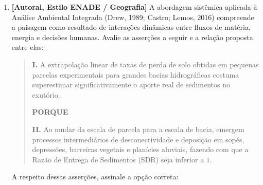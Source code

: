 \begin{enumerate}[leftmargin=1.8em, itemsep=5pt, resume]
  \item \textbf{[Autoral, Estilo ENADE / Geografia]} A abordagem sistêmica aplicada à Análise Ambiental Integrada (Drew, 1989; Castro; Lemos, 2016) compreende a paisagem como resultado de interações dinâmicas entre fluxos de matéria, energia e decisões humanas. Avalie as asserções a seguir e a relação proposta entre elas:
  \begin{quote}
    \textbf{I.} A extrapolação linear de taxas de perda de solo obtidas em pequenas parcelas experimentais para grandes bacias hidrográficas costuma superestimar significativamente o aporte real de sedimentos no exutório.
    \par\vspace{3pt}
    \textbf{PORQUE}
    \par\vspace{3pt}
    \textbf{II.} Ao mudar da escala de parcela para a escala de bacia, emergem processos intermediários de desconectividade e deposição em sopés, depressões, barreiras vegetais e planícies aluviais, fazendo com que a Razão de Entrega de Sedimentos (SDR) seja inferior a $1$.
  \end{quote}
  A respeito dessas asserções, assinale a opção correta:
  \espacoResolucao[1.2cm]


\end{enumerate}
